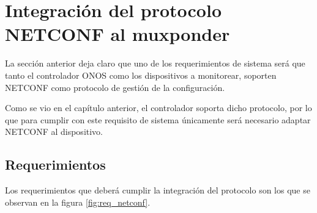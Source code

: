 \newpage

  \section{Integración del protocolo NETCONF al muxponder}
  La sección anterior deja claro que uno de los requerimientos de sistema será que tanto el controlador ONOS como los dispositivos a monitorear, soporten NETCONF como protocolo de gestión de la configuración. 
  
  Como se vio en el capítulo anterior, el controlador soporta dicho protocolo, por lo que para cumplir con este requisito de sistema únicamente será necesario adaptar NETCONF al dispositivo. 
  

  \subsection{Requerimientos}

  Los requerimientos que deberá cumplir la integración del protocolo son los que se observan en la figura \ref{fig:req_netconf}.

